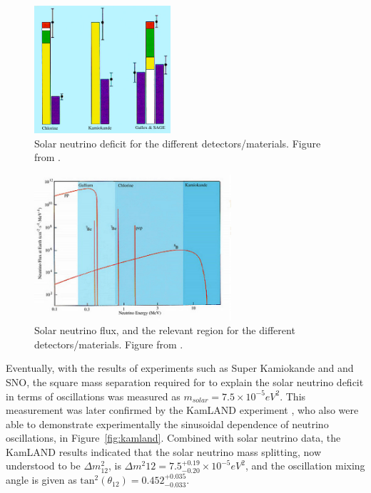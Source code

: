 \begin{figure}[htbp]
  \centering
  \includegraphics[width=0.45\textwidth]{intro_figures/solar_neutrino_deficit.png}
  \caption[Solar Neutrino Deficit]{Solar neutrino deficit for the different detectors/materials.  Figure from \cite{solar_neutrino_image}.}
  \label{fig:solar_neutrino_deficit}
\end{figure}

\begin{figure}[htbp]
  \centering
  \includegraphics[width=0.65\textwidth]{intro_figures/solar_neutrino_flux.png}
  \caption[Solar Neutrino Deficit]{Solar neutrino flux, and the relevant region for the different detectors/materials.  Figure from \cite{solar_neutrino_image}.}
  \label{fig:solar_neutrino_flux}
\end{figure}

Eventually, with the results of experiments such as Super Kamiokande and and SNO, the square mass separation required for to explain the solar neutrino deficit in terms of oscillations was measured as $m_{solar} = 7.5 \times 10^{-5} eV^2$.  This measurement was later confirmed by the KamLAND experiment \cite{Eguchi:2002dm, Araki:2004mb}, who also were able to demonstrate experimentally the sinusoidal dependence of neutrino oscillations, in Figure~\ref{fig:kamland}.  Combined with solar neutrino data, the KamLAND results \cite{Abe:2008aa,Gando:2010aa} indicated that the solar neutrino mass splitting, now understood to be $\Delta m^2_{12}$, is $\Delta m^2{12} = 7.5^{+0.19}_{-0.20} \times 10^{-5} eV^2$, and the oscillation mixing angle is given as $\text{tan}^2(\theta_{12}) = 0.452^{+0.035}_{-0.033}$.

